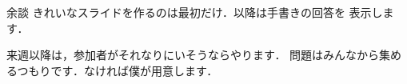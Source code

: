 \documentclass[dvipdfmx]{beamer}
\begin{document}
	\begin{frame}{余談}
		きれいなスライドを作るのは最初だけ．以降は手書きの回答を
		表示します．

		来週以降は，参加者がそれなりにいそうならやります．
		問題はみんなから集めるつもりです．なければ僕が用意します．

	\end{frame}
\end{document}
